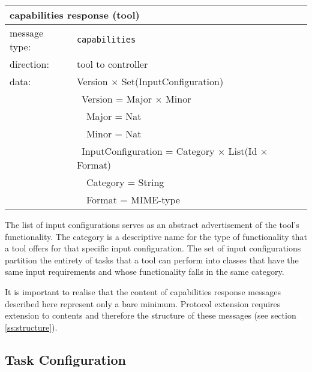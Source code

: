 \documentclass{article}
\newcommand{\msg}[1]{\texttt{#1}}
\begin{document}
   \begin{table}[H]
    \begin{center}
     \begin{tabular}{|ll|}
      \hline
       \multicolumn{2}{|l|}{\textbf{capabilities response (tool)}} \\
      \hline
       message type:   & \msg{capabilities} \\
      \hline
       direction:      & tool to controller \\
       data:           & Version $\times$ Set(InputConfiguration) \\
                       & \ Version = Major $\times$ Minor \\
                       & \ \ Major = Nat \\
                       & \ \ Minor = Nat \\
                       & \ InputConfiguration = Category $\times$ List(Id $\times$ Format) \\
                       & \ \ Category = String \\
                       & \ \ Format = MIME-type \\
      \hline
     \end{tabular}
    \end{center}
    \vspace{-0.3cm}
   \end{table}

   \noindent The list of input configurations serves as an abstract
   advertisement of the tool's functionality.  The category is a descriptive
   name for the type of functionality that a tool offers for that specific
   input configuration.  The set of input configurations partition the entirety
   of tasks that a tool can perform into classes that have the same input
   requirements and whose functionality falls in the same category.
   
   It is important to realise that the content of capabilities response
   messages described here represent only a bare minimum. Protocol extension
   requires extension to contents and therefore the structure of these
   messages (see section \ref{ss:structure}).

  \subsection{Task Configuration} \label{ss::task_configuration}

\end{document}
